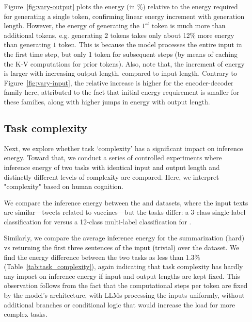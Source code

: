 Figure~\ref{fig:vary-output} plots the energy (in \%) relative to the energy required for generating a single token, confirming linear energy increment with generation length.
However, the energy of generating the $1^{st}$ token is much more than additional tokens, e.g. generating $2$ tokens takes only about 12\% more energy than generating $1$ token. This is because the model processes the entire input in the first time step, but only 1 token for subsequent steps (by means of caching the K-V computations for prior tokens).
Also, note that, the increment of energy is larger with increasing output length, compared to input length.  
%
Contrary to Figure~\ref{fig:vary-input}, the relative increase is higher for the encoder-decoder family here, attributed to the fact that initial energy requirement is smaller for these families, along with higher jumps in energy with output length. 
%




\subsection{Task complexity}
\label{sec:complexity}

Next, we explore whether task `complexity' has a significant impact on inference energy. Toward that, we conduct a series of controlled experiments %
where inference energy of two tasks with identical input and output length and distinctly different levels of complexity are compared. %
Here, we interpret "complexity" based on human cognition.


We compare the inference energy between the \vax and \caves datasets, where the input texts are similar—tweets related to vaccines—but the tasks differ: a 3-class single-label classification for \vax{} versus a 12-class multi-label classification for \caves{}.


Similarly, we compare the average inference energy for the summarization (hard) vs returning the first three sentences of the input (trivial) over the \cnndm dataset. 
We find the energy difference between the two tasks as less than 1.3\% (Table~\ref{tab:task_complexity}), again indicating that task complexity has hardly any impact on inference energy if input and output lengths are kept fixed.  
This observation follows from the fact that the computational steps per token are fixed by the model's architecture, with  
LLMs processing the inputs uniformly, without additional branches or conditional logic that would increase the load for more complex tasks.

